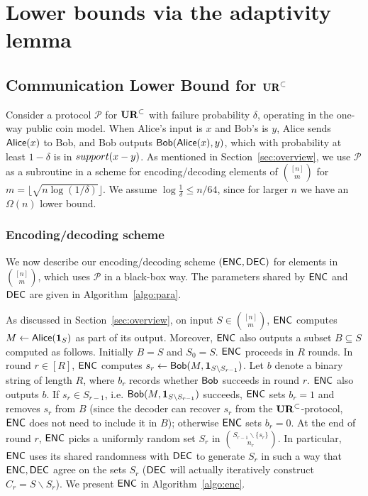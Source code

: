 \section{Lower bounds via the adaptivity lemma}\label{sec:adaptive-proof}
\subsection{Communication Lower Bound for $\mathbf{UR}^\subset$} \label{sec:optimal-lb}

Consider a protocol $\mathcal{P}$ for $\mathbf{UR}^\subset$ with failure probability $\delta$, operating in the one-way public coin model. When Alice's input is $x$ and Bob's is $y$, Alice sends $\mathsf{Alice}(x)$ to Bob, and Bob outputs $\mathsf{Bob}(\mathsf{Alice}(x), y)$, which with probability at least $1-\delta$ is in $\mathop{support}(x-y)$. As mentioned in Section~\ref{sec:overview}, we use $\mathcal{P}$ as a subroutine in a scheme for encoding/decoding elements of $\binom{[n]}m$ for $m = \lfloor \sqrt{n\log(1/\delta)}\rfloor$. We assume $\log \frac 1{\delta} \le n/64$, since for larger $n$ we have an $\Omega(n)$ lower bound.

\subsubsection{Encoding/decoding scheme}
We now describe our encoding/decoding scheme $(\textsf{ENC}, \textsf{DEC})$ for elements in ${[n] \choose m}$, which uses $\mathcal{P}$ in a black-box way. The parameters shared by $\textsf{ENC}$ and $\textsf{DEC}$ are given in Algorithm~\ref{algo:para}.

As discussed in Section~\ref{sec:overview}, on input $S\in {[n] \choose m}$, $\textsf{ENC}$ computes $M \leftarrow \mathsf{Alice}(\mathbf{1}_S)$ as part of its output. Moreover, $\textsf{ENC}$ also outputs a subset $B\subseteq S$ computed as follows. Initially $B=S$ and $S_0=S$. $\textsf{ENC}$ proceeds in $R$ rounds.  In round $r\in[R]$, $\textsf{ENC}$ computes $s_r\leftarrow \mathsf{Bob}(M, \mathbf{1}_{S\backslash S_{r-1}})$.  Let $b$ denote a binary string of length $R$, where $b_r$ records whether $\mathsf{Bob}$ succeeds in round $r$.  $\textsf{ENC}$ also outputs $b$.  If $s_r\in S_{r-1}$, i.e. $\mathsf{Bob}(M, \mathbf{1}_{S\backslash S_{r-1}})$ succeeds, $\textsf{ENC}$ sets $b_r=1$ and removes $s_r$ from $B$ (since the decoder can recover $s_r$ from the $\mathbf{UR}^\subset$-protocol, $\textsf{ENC}$ does not need to include it in $B$); otherwise $\textsf{ENC}$ sets $b_r=0$.  At the end of round $r$, $\textsf{ENC}$ picks a uniformly random set $S_r$ in $\binom{S_{r-1}\backslash \{s_r\}}{n_r}$.  In particular, $\textsf{ENC}$ uses its shared randomness with $\textsf{DEC}$ to generate $S_r$ in such a way that $\textsf{ENC}, \textsf{DEC}$ agree on the sets $S_r$ ($\textsf{DEC}$ will actually iteratively construct $C_r = S\backslash S_r$). We present $\textsf{ENC}$ in Algorithm~\ref{algo:enc}.

